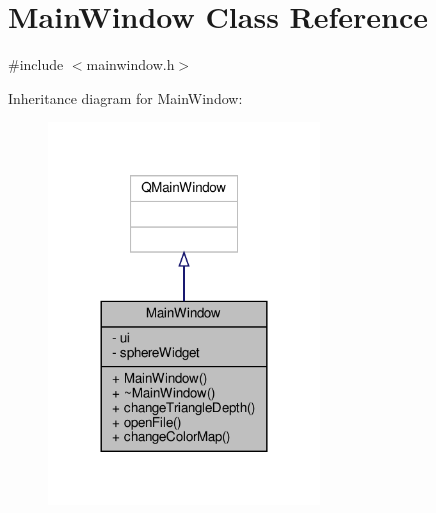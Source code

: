\hypertarget{class_main_window}{}\section{Main\+Window Class Reference}
\label{class_main_window}


{\ttfamily \#include $<$mainwindow.\+h$>$}



Inheritance diagram for Main\+Window\+:\nopagebreak
\begin{figure}[H]
\begin{center}
\leavevmode
\includegraphics[width=204pt]{class_main_window__inherit__graph}
\end{center}
\end{figure}


